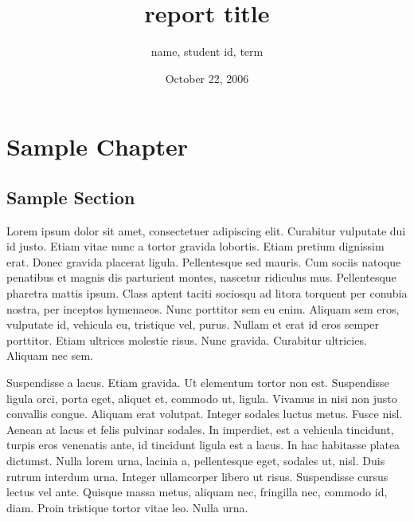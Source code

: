 \documentclass[nobinding]{sydeStyle}	%
\begin{document}
\title{report title}
\author{name, student id, term}
\date{October 22, 2006}
\maketitle


\cleardoublepage
{}

\setcounter{page}{2} %
\tableofcontents
{}

\listoftables
{}

\listoffigures
{}

\cleardoublepage
{}


\chapter{Sample Chapter}%
	\section{Sample Section}
Lorem ipsum dolor sit amet, consectetuer adipiscing elit. Curabitur vulputate dui id justo. Etiam vitae nunc a tortor gravida lobortis. Etiam pretium dignissim erat. Donec gravida placerat ligula. Pellentesque sed mauris. Cum sociis natoque penatibus et magnis dis parturient montes, nascetur ridiculus mus. Pellentesque pharetra mattis ipsum. Class aptent taciti sociosqu ad litora torquent per conubia nostra, per inceptos hymenaeos. Nunc porttitor sem eu enim. Aliquam sem eros, vulputate id, vehicula eu, tristique vel, purus. Nullam et erat id eros semper porttitor. Etiam ultrices molestie risus. Nunc gravida. Curabitur ultricies. Aliquam nec sem.

Suspendisse a lacus. Etiam gravida. Ut elementum tortor non est. Suspendisse ligula orci, porta eget, aliquet et, commodo ut, ligula. Vivamus in nisi non justo convallis congue. Aliquam erat volutpat. Integer sodales luctus metus. Fusce nisl. Aenean at lacus et felis pulvinar sodales. In imperdiet, est a vehicula tincidunt, turpis eros venenatis ante, id tincidunt ligula est a lacus. In hac habitasse platea dictumst. Nulla lorem urna, lacinia a, pellentesque eget, sodales ut, nisl. Duis rutrum interdum urna. Integer ullamcorper libero ut risus. Suspendisse cursus lectus vel ante. Quisque massa metus, aliquam nec, fringilla nec, commodo id, diam. Proin tristique tortor vitae leo. Nulla urna.
\end{document}

